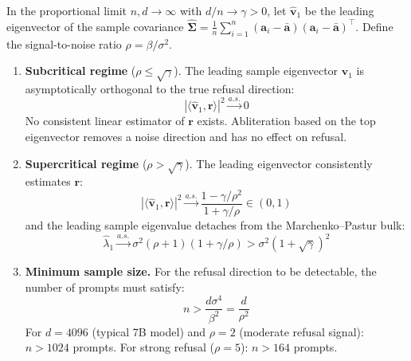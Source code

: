 \begin{theorem}
\label{thm:bbp}
In the proportional limit $n, d \to \infty$ with $d/n \to \gamma > 0$, let $\hat{\mathbf{v}}_1$ be the leading eigenvector of the sample covariance $\hat{\boldsymbol{\Sigma}} = \frac{1}{n}\sum_{i=1}^n (\mathbf{a}_i - \bar{\mathbf{a}})(\mathbf{a}_i - \bar{\mathbf{a}})^\top$.
Define the signal-to-noise ratio $\rho = \beta/\sigma^2$.

\begin{enumerate}[label=(\roman*)]
    \item \textbf{Subcritical regime} ($\rho \leq \sqrt{\gamma}$).
    The leading sample eigenvector $\hat{\mathbf{v}}_1$ is asymptotically orthogonal to the true refusal direction:
    \begin{equation}
        |\langle \hat{\mathbf{v}}_1, \mathbf{r} \rangle|^2 \xrightarrow{a.s.} 0
    \end{equation}
    No consistent linear estimator of $\mathbf{r}$ exists.
    Abliteration based on the top eigenvector removes a noise direction and has no effect on refusal.

    \item \textbf{Supercritical regime} ($\rho > \sqrt{\gamma}$).
    The leading eigenvector consistently estimates $\mathbf{r}$:
    \begin{equation}
        |\langle \hat{\mathbf{v}}_1, \mathbf{r} \rangle|^2 \xrightarrow{a.s.} \frac{1 - \gamma/\rho^2}{1 + \gamma/\rho} \in (0, 1)
    \end{equation}
    and the leading sample eigenvalue detaches from the Marchenko--Pastur bulk:
    \begin{equation}
        \hat{\lambda}_1 \xrightarrow{a.s.} \sigma^2(\rho + 1)(1 + \gamma/\rho) > \sigma^2(1+\sqrt{\gamma})^2
    \end{equation}

    \item \textbf{Minimum sample size.}
    For the refusal direction to be detectable, the number of prompts must satisfy:
    \begin{equation}
        n > \frac{d \sigma^4}{\beta^2} = \frac{d}{\rho^2}
    \end{equation}
    For $d = 4096$ (typical 7B model) and $\rho = 2$ (moderate refusal signal): $n > 1024$ prompts.
    For strong refusal ($\rho = 5$): $n > 164$ prompts.
\end{enumerate}
\end{theorem}

